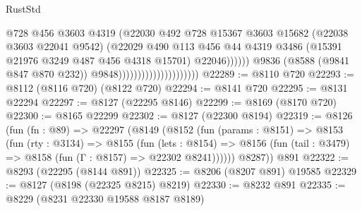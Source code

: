 \begin{lexlean}{RustStd}
\begin{coremodule}
                                                      @728
                                                      @456
                                                      @3603
                                                      @4319
                                                      (@22030
                                                        @492
                                                        @728
                                                        @15367
                                                        @3603
                                                        @15682
                                                        (@22038 @3603 @22041 @9542)
                                                        (@22029
                                                          @490
                                                          @113
                                                          @456
                                                          @44
                                                          @4319
                                                          @3486
                                                          (@15391
                                                            @21976
                                                            @3249
                                                            @487
                                                            @456
                                                            @4318
                                                            @15701)
                                                          @22046))))))
                                              @9836
                                              (@8588 (@9841 @847 @870 @232))
                                              @9848)))))))))))))))))))))
@22289 := @8110 @720
@22293 := @8112 (@8116 @720) (@8122 @720)
@22294 := @8141 @720
@22295 := @8131 @22294
@22297 := @8127 (@22295 @8146)
@22299 := @8169 (@8170 @720)
@22300 := @8165 @22299
@22302 := @8127 (@22300 @8194)
@22319 := @8126
    (fun (fn : @89) =>
    @22297
      (@8149
        (@8152
          (fun (params : @8151) =>
          @8153
            (fun (rty : @3134) =>
            @8155
              (fun (lets : @8154) =>
              @8156 (fun (tail : @3479) => @8158 (fun (Γ : @8157) => @22302 @8241))))))
        @8287))
    @891
@22322 := @8293 (@22295 (@8144 @891))
@22325 := @8206 (@8207 @891) @19585
@22329 := @8127 (@8198 (@22325 @8215) @8219)
@22330 := @8232 @891
@22335 := @8229 (@8231 @22330 @19588 @8187 @8189)

\end{coremodule}
\end{lexlean}
